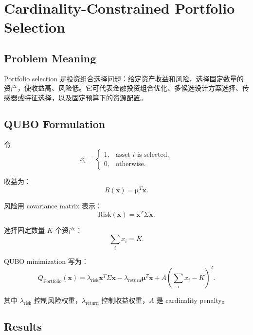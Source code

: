 \documentclass[UTF8]{ctexart}
\begin{document}
\section{Cardinality-Constrained Portfolio Selection}

\subsection{Problem Meaning}

Portfolio selection 是投资组合选择问题：给定资产收益和风险，选择固定数量的资产，使收益高、风险低。它可代表金融投资组合优化、多候选设计方案选择、传感器或特征选择，以及固定预算下的资源配置。

\subsection{QUBO Formulation}

令
\begin{equation}
x_i =
\begin{cases}
1, & \text{asset } i \text{ is selected},\\
0, & \text{otherwise}.
\end{cases}
\end{equation}

收益为：
\begin{equation}
R(\bm{x})=\bm{\mu}^{T}\bm{x}.
\end{equation}

风险用 covariance matrix 表示：
\begin{equation}
\mathrm{Risk}(\bm{x})
=
\bm{x}^{T}\Sigma\bm{x}.
\end{equation}

选择固定数量 $K$ 个资产：
\begin{equation}
\sum_i x_i=K.
\end{equation}

QUBO minimization 写为：
\begin{equation}
Q_{\mathrm{Portfolio}}(\bm{x})
=
\lambda_{\mathrm{risk}}
\bm{x}^{T}\Sigma\bm{x}
-
\lambda_{\mathrm{return}}
\bm{\mu}^{T}\bm{x}
+
A
\left(
\sum_i x_i-K
\right)^2.
\end{equation}

其中 $\lambda_{\mathrm{risk}}$ 控制风险权重，$\lambda_{\mathrm{return}}$ 控制收益权重，$A$ 是 cardinality penalty。

\subsection{Results}
\end{document}
